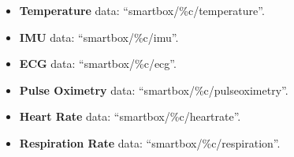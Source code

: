 \begin{itemize}
    \item \textbf{Temperature} data: ``smartbox/\%c/temperature''.
    \item \textbf{\acf{IMU}} data: ``smartbox/\%c/imu''.
    \item \textbf{\acf{ECG}} data: ``smartbox/\%c/ecg''.
    \item \textbf{Pulse Oximetry} data: ``smartbox/\%c/pulseoximetry''.
    \item \textbf{Heart Rate} data: ``smartbox/\%c/heartrate''.
    \item \textbf{Respiration Rate} data: ``smartbox/\%c/respiration''.
\end{itemize}

% 
% 
%                  
